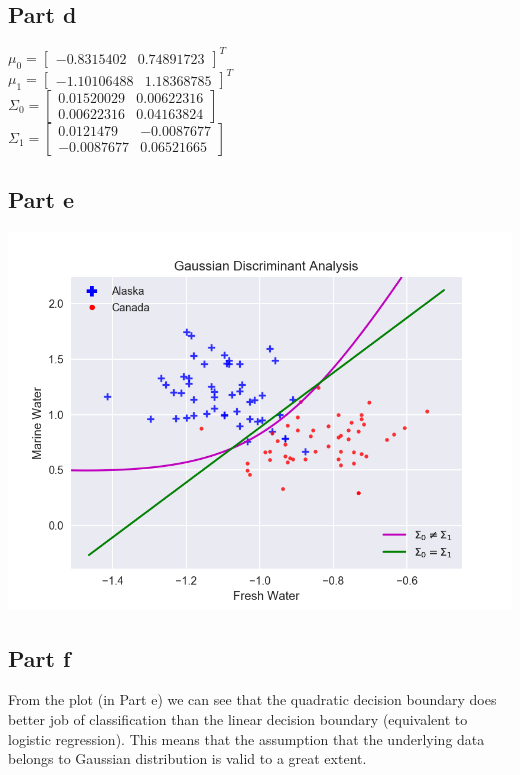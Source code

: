 \documentclass[12pt]{article}
\begin{document}
\subsection*{Part d}
\begin{addmargin}[0.3in]{0in}
$\mu_0 = \begin{bmatrix} -0.8315402 & 0.74891723\end{bmatrix}^{T}$ \\
$\mu_1 = \begin{bmatrix} -1.10106488 & 1.18368785\end{bmatrix}^{T}$ \\
$\Sigma_0 = 
\begin{bmatrix}
    0.01520029 & 0.00622316 \\
    0.00622316 & 0.04163824
\end{bmatrix}$ \\
$\Sigma_1 = 
\begin{bmatrix}
    0.0121479 & -0.0087677 \\
    -0.0087677 & 0.06521665
\end{bmatrix}$
\end{addmargin}
\subsection*{Part e}
\begin{center}
\includegraphics[scale=0.5]{gda3.png}
\end{center}
\subsection*{Part f}
\begin{addmargin}[0.3in]{0in}
From the plot (in Part e) we can see that the quadratic decision boundary does better job of classification than the linear decision boundary (equivalent to logistic regression). This means that the assumption that the underlying data belongs to Gaussian distribution is valid to a great extent.
\end{addmargin}
\end{document}
